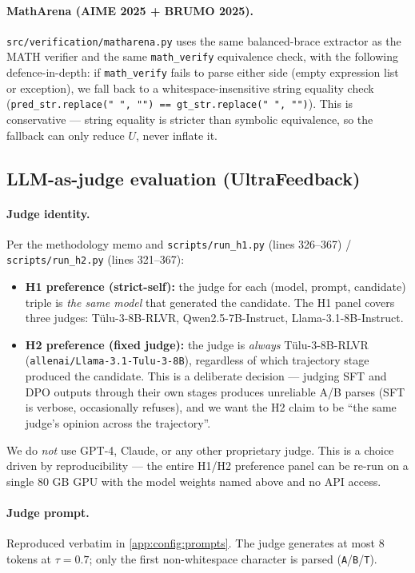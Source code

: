 \paragraph{MathArena (AIME 2025 + BRUMO 2025).}
\texttt{src/verification/matharena.py} uses the same balanced-brace
extractor as the MATH verifier and the same
\texttt{math\_verify} equivalence check, with the following
defence-in-depth: if \texttt{math\_verify} fails to parse either side
(empty expression list or exception), we fall back to a
whitespace-insensitive string equality check
(\texttt{pred\_str.replace(" ", "") == gt\_str.replace(" ", "")}).
This is conservative — string equality is stricter than symbolic
equivalence, so the fallback can only reduce $U$, never inflate it.

\subsection{LLM-as-judge evaluation (UltraFeedback)}

\paragraph{Judge identity.}
Per the methodology memo and \texttt{scripts/run\_h1.py}
(lines 326--367) / \texttt{scripts/run\_h2.py} (lines 321--367):
\begin{itemize}
\item \textbf{H1 preference (strict-self):} the judge for each
      (model, prompt, candidate) triple is \emph{the same model} that
      generated the candidate. The H1 panel covers three judges:
      Tülu-3-8B-RLVR, Qwen2.5-7B-Instruct, Llama-3.1-8B-Instruct.
\item \textbf{H2 preference (fixed judge):} the judge is \emph{always}
      Tülu-3-8B-RLVR (\texttt{allenai/Llama-3.1-Tulu-3-8B}), regardless
      of which trajectory stage produced the candidate. This is a
      deliberate decision — judging SFT and DPO outputs through their
      own stages produces unreliable A/B parses (SFT is verbose,
      occasionally refuses), and we want the H2 claim to be ``the same
      judge's opinion across the trajectory''.
\end{itemize}
We do \emph{not} use GPT-4, Claude, or any other proprietary judge.
This is a choice driven by reproducibility — the entire H1/H2
preference panel can be re-run on a single 80 GB GPU with the model
weights named above and no API access.

\paragraph{Judge prompt.}
Reproduced verbatim in \cref{app:config:prompts}. The judge generates
at most 8 tokens at $\tau{=}0.7$; only the first non-whitespace
character is parsed (\texttt{A}/\texttt{B}/\texttt{T}).

